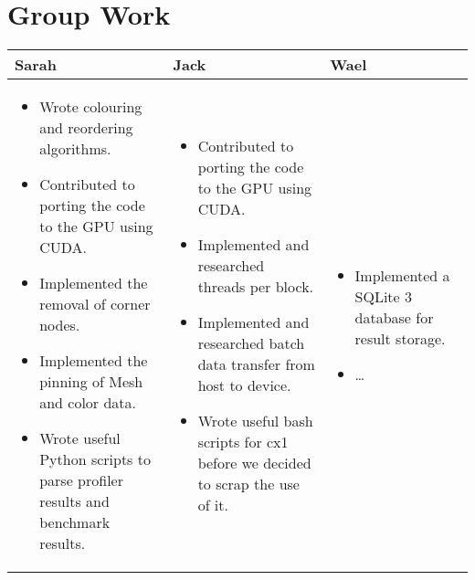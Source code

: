 \section*{Group Work}
\begin{tabular}{|p{5.5cm}| p{5.5cm} | p{5.5cm} |}
  \hline
  Sarah & Jack & Wael\\
  \hline
  \hline
  \begin{itemize}
    \item Wrote colouring and reordering algorithms.
    \item Contributed to porting the code to the GPU using CUDA.
    \item Implemented the removal of corner nodes.
    \item Implemented the pinning of Mesh and color data.
    \item Wrote useful Python scripts to parse profiler results and benchmark results.
  \end{itemize} &

  \begin{itemize}
    \item Contributed to porting the code to the GPU using CUDA.
    \item Implemented and researched threads per block.
    \item Implemented and researched batch data transfer from host to device.
    \item Wrote useful bash scripts for cx1 before we decided to scrap the use of it.
  \end{itemize} &

  \begin{itemize}
    \item Implemented a SQLite 3 database for result storage.
    \item \ldots
  \end{itemize} \\
  \hline
\end{tabular}
